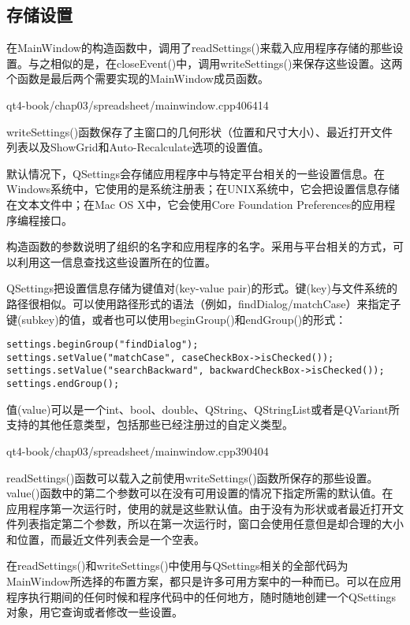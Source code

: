 \documentclass[11pt,oneside]{book}
\begin{document}
\begin{common-format}
\section{存储设置}
在MainWindow的构造函数中，调用了readSettings()来载入应用程序存储的那些设置。与之相似的是，在closeEvent()中，调用writeSettings()来保存这些设置。这两个函数是最后两个需要实现的MainWindow成员函数。

\begin{cppline}{qt4-book/chap03/spreadsheet/mainwindow.cpp}{406}{414}
\end{cppline}

writeSettings()函数保存了主窗口的几何形状（位置和尺寸大小）、最近打开文件列表以及ShowGrid和Auto-Recalculate选项的设置值。

默认情况下，QSettings会存储应用程序中与特定平台相关的一些设置信息。在Windows系统中，它使用的是系统注册表；在UNIX系统中，它会把设置信息存储在文本文件中；在Mac OS X中，它会使用Core Foundation Preferences的应用程序编程接口。

构造函数的参数说明了组织的名字和应用程序的名字。采用与平台相关的方式，可以利用这一信息查找这些设置所在的位置。

QSettings把设置信息存储为键值对(key-value pair)的形式。键(key)与文件系统的路径很相似。可以使用路径形式的语法（例如，findDialog/matchCase）来指定子键(subkey)的值，或者也可以使用beginGroup()和endGroup()的形式： 
\begin{Verbatim}
settings.beginGroup("findDialog");
settings.setValue("matchCase", caseCheckBox->isChecked());
settings.setValue("searchBackward", backwardCheckBox->isChecked());
settings.endGroup();
\end{Verbatim}
  
值(value)可以是一个int、bool、double、QString、QStringList或者是QVariant所支持的其他任意类型，包括那些已经注册过的自定义类型。

\begin{cppline}{qt4-book/chap03/spreadsheet/mainwindow.cpp}{390}{404}
\end{cppline}

readSettings()函数可以载入之前使用writeSettings()函数所保存的那些设置。value()函数中的第二个参数可以在没有可用设置的情况下指定所需的默认值。在应用程序第一次运行时，使用的就是这些默认值。由于没有为形状或者最近打开文件列表指定第二个参数，所以在第一次运行时，窗口会使用任意但是却合理的大小和位置，而最近文件列表会是一个空表。

在readSettings()和writeSettings()中使用与QSettings相关的全部代码为MainWindow所选择的布置方案，都只是许多可用方案中的一种而已。可以在应用程序执行期间的任何时候和程序代码中的任何地方，随时随地创建一个QSettings对象，用它查询或者修改一些设置。


\end{common-format}
\end{document}
